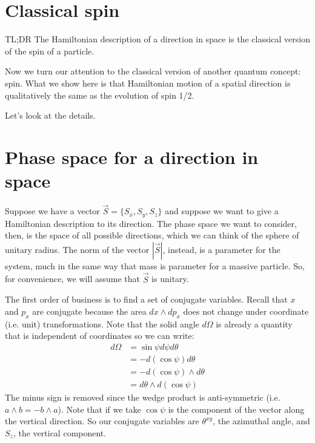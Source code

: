 \documentclass[aps,pra,10pt,floatfix,nofootinbib]{revtex4-1}
\theoremstyle{definition}
\begin{document}
\section{Classical spin}

TL;DR The Hamiltonian description of a direction in space is the classical version of the spin of a particle.

Now we turn our attention to the classical version of another quantum concept: spin. What we show here is that Hamiltonian motion of a spatial direction is qualitatively the same as the evolution of spin 1/2.

Let's look at the details.

\section{Phase space for a direction in space}

Suppose we have a vector $\vec{S} = \{S_x, S_y, S_z\}$ and suppose we want to give a Hamiltonian description to its direction. The phase space we want to consider, then, is the space of all possible directions, which we can think of the sphere of unitary radius. The norm of the vector $|\vec{S}|$, instead, is a parameter for the system, much in the same way that mass is parameter for a massive particle. So, for convenience, we will assume that $\vec{S}$ is unitary.

The first order of business is to find a set of conjugate variables. Recall that $x$ and $p_x$ are conjugate because the area $dx \wedge dp_x$ does not change under coordinate (i.e. unit) transformations. Note that the solid angle $d\Omega$ is already a quantity that is independent of coordinates so we can write:
\begin{equation}
\begin{aligned}
d\Omega &= \sin \psi d\psi d\theta \\
&= - d(\cos \psi) d\theta \\
&= - d(\cos \psi) \wedge d\theta \\
&=  d\theta \wedge d(\cos \psi)
\end{aligned}
\label{DirectionDOF}
\end{equation}
The minus sign is removed since the wedge product is anti-symmetric (i.e. $a \wedge b = - b \wedge a$). Note that if we take $\cos \psi$ is the component of the vector along the vertical direction. So our conjugate variables are $\theta^{xy}$, the azimuthal angle, and $S_z$, the vertical component.
\end{document}

